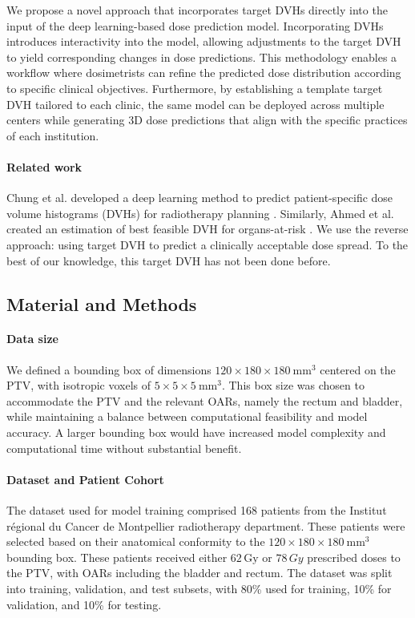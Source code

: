 We propose a novel approach that incorporates target DVHs directly into the input of the deep learning-based dose prediction model.
Incorporating DVHs introduces interactivity into the model, allowing adjustments to the target DVH to yield corresponding changes in dose predictions.
This methodology enables a workflow where dosimetrists can refine the predicted dose distribution according to specific clinical objectives.
Furthermore, by establishing a template target DVH tailored to each clinic, the same model can be deployed across multiple centers while generating 3D dose predictions that align with the specific practices of each institution.

\paragraph{Related work}
Chung et al. developed a deep learning method to predict patient-specific dose volume histograms (DVHs) for radiotherapy planning \cite{Chen2021}.
Similarly, Ahmed et al. created an estimation of best feasible DVH for organs-at-risk \cite{Ahmed2017}.
We use the reverse approach: using target DVH to predict a clinically acceptable dose spread.
To the best of our knowledge, this target DVH has not been done before.

\subsection{Material and Methods}
\paragraph{Data size}
We defined a bounding box of dimensions $120 \times 180 \times 180\ \text{mm}^3$ centered on the PTV, with isotropic voxels of $5 \times 5 \times 5\ \text{mm}^3$.
This box size was chosen to accommodate the PTV and the relevant OARs, namely the rectum and bladder, while maintaining a balance between computational feasibility and model accuracy.
A larger bounding box would have increased model complexity and computational time without substantial benefit.

\paragraph{Dataset and Patient Cohort}
The dataset used for model training comprised 168 patients from the Institut régional du Cancer de Montpellier radiotherapy department.
These patients were selected based on their anatomical conformity to the $120 \times 180 \times 180\ \text{mm}^3$ bounding box.
These patients received either $62\,\text{Gy}$ or $78\,\textit{Gy}$ prescribed doses to the PTV, with OARs including the bladder and rectum.
The dataset was split into training, validation, and test subsets, with 80\% used for training, 10\% for validation, and 10\% for testing.

